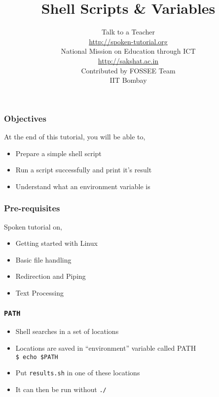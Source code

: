 \documentclass[17pt,compress]{beamer}
\author[FOSSEE]{}
\institute[IIT Bombay]{}
\date[]{}
\begin{document}
\sffamily \bfseries
\title
[Shell Scripts \& Variables]
{Shell Scripts \& Variables}
\author
[FOSSEE]
{\small Talk to a Teacher\\{\color{blue}\url{http://spoken-tutorial.org}}\\\vspace{0.25cm}National Mission on Education
 through ICT\\{\color{blue}\url{ http://sakshat.ac.in}} \\ [1.65cm]
   Contributed by FOSSEE Team \\IIT Bombay  \\[0.3cm]
}

\begin{frame}
   \titlepage
\end{frame}

\begin{frame}
\frametitle{Objectives}
\label{sec-2}

At the end of this tutorial, you will be able to,
\begin{itemize}
\item Prepare a simple shell script
\item Run a script successfully and print it's result
\item Understand what an environment variable is
\end{itemize}
\end{frame}

\begin{frame}
\frametitle{Pre-requisites}
\label{sec-3}

Spoken tutorial on,
\begin{itemize}
\item Getting started with Linux
\item Basic file handling
\item Redirection and Piping
\item Text Processing
\end{itemize}
\end{frame}

\begin{frame}[fragile]
  \frametitle{\texttt{PATH}}
  \begin{itemize}
  \item Shell searches in a set of locations 
  \item Locations are saved in ``environment'' variable called PATH\\
  \texttt{\$ echo \$PATH}
  \item Put \texttt{results.sh} in one of these locations
  \item It can then be run without \texttt{./} 
  \end{itemize}
\end{frame}
\end{document}
